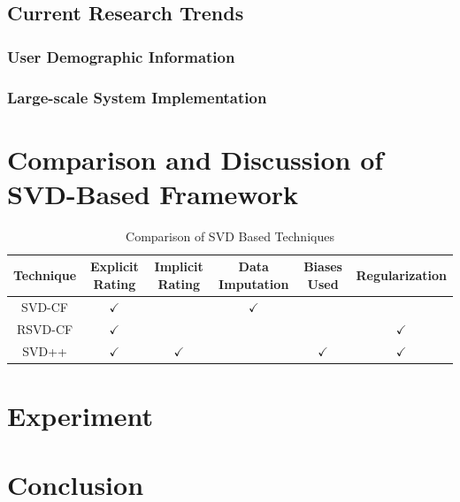 \documentclass[letter paper, 11pt]{article}
\begin{document}
	
	\subsection{Current Research Trends}
	\subsubsection{User Demographic Information}
	
	
	\subsubsection{Large-scale System Implementation}
	
	\section{Comparison and Discussion of SVD-Based Framework}



	\begin{table}
		\centering
		\begin{tabular}{|c|c|c|c|c|c|}
			\hline
			Technique & Explicit Rating & Implicit Rating & Data Imputation & Biases Used & Regularization \\ \hline
			SVD-CF & $\checkmark$ &  & $\checkmark$ &  &  \\ \hline
			RSVD-CF & $\checkmark$ &  & &  & $\checkmark$ \\ \hline
			SVD++ & $\checkmark$ & $\checkmark$ & & $\checkmark$ & $\checkmark$ \\ \hline
		\end{tabular}
		\caption{Comparison of SVD Based Techniques\cite{review}}
		\label{comparison}
	\end{table}
	
	
	\section{Experiment}
	
	
	\section{Conclusion}

	
	
\end{document}
